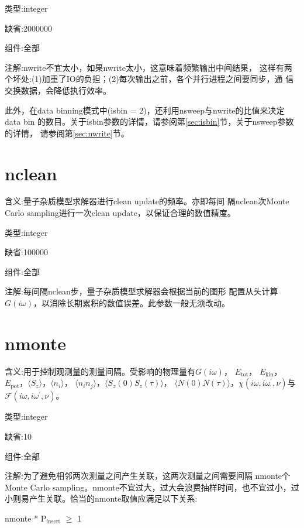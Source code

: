 {\color{green}类型}:integer

{\color{blue}缺省}:2000000

{\color{brown}组件}:全部

{\color{purple}注解}:nwrite不宜太小，如果nwrite太小，这意味着频繁输出中间结果，
这样有两个坏处:(1)加重了IO的负担；(2)每次输出之前，各个并行进程之间要同步，通
信交换数据，会降低执行效率。

此外，在data binning模式中(isbin = 2)，还利用nsweep与nwrite的比值来决定data bin
的数目。关于isbin参数的详情，请参阅第\ref{sec:isbin}节，关于nsweep参数的详情，
请参阅第\ref{sec:nwrite}节。

\section{nclean}
\label{sec:nclean}

{\color{red}含义}:量子杂质模型求解器进行clean update的频率。亦即每间
隔nclean次Monte Carlo sampling进行一次clean update，以保证合理的数值精度。

{\color{green}类型}:integer

{\color{blue}缺省}:100000

{\color{brown}组件}:全部

{\color{purple}注解}:每间隔nclean步，量子杂质模型求解器会根据当前的图形
配置从头计算$G(i\omega)$，以消除长期累积的数值误差。此参数一般无须改动。

\section{nmonte}
\label{sec:nmonte}

{\color{red}含义}:用于控制观测量的测量间隔。受影响的物理量有$G(i\omega)$， $E_{\text{tot}}$， 
$E_{\text{kin}}$， $E_{\text{pot}}$，$\langle S_{z} \rangle$，$\langle n_{i} \rangle$，
$\langle n_{i} n_{j} \rangle$，$\langle S_{z}(0)S_{z}(\tau)\rangle$，
$\langle N(0)N(\tau)\rangle$，$\chi(i\omega,i\omega^{\prime},\nu)$与
$\mathcal{F}(i\omega,i\omega^{\prime},\nu)$。

{\color{green}类型}:integer

{\color{blue}缺省}:10

{\color{brown}组件}:全部

{\color{purple}注解}:为了避免相邻两次测量之间产生关联，这两次测量之间需要间隔
nmonte个Monte Carlo sampling。nmonte不宜过大，过大会浪费抽样时间，也不宜过小，过
小则易产生关联。恰当的nmonte取值应满足以下关系:

nmonte * P$_{\text{insert}}$ $\ge$ 1

